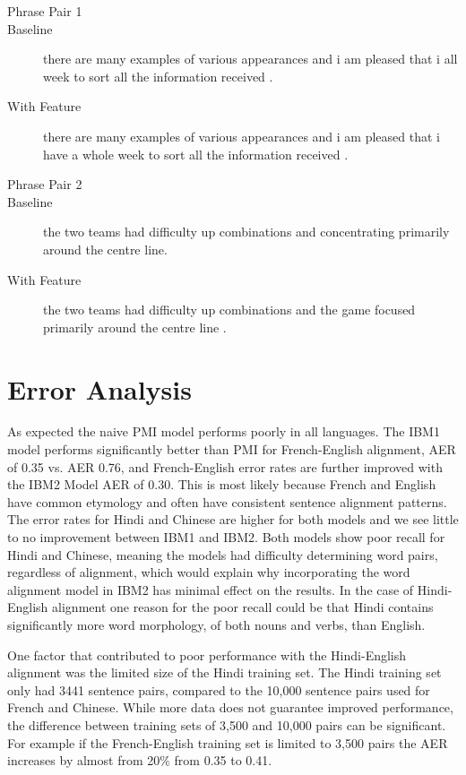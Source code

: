 \documentclass{article}
\begin{document}
\begin{description}

\item[Phrase Pair 1]
\item[Baseline] there are many examples of various appearances and i am pleased that i all week to sort all the information received .

\item[With Feature] there are many examples of various appearances and i am pleased that i have a whole week to sort all the information received .

\item[Phrase Pair 2]
\item[Baseline] the two teams had difficulty up combinations and concentrating primarily around the centre line.

\item[With Feature] the two teams had difficulty up combinations and the game focused primarily around the centre line .
\end{description}

\section*{Error Analysis}

As expected the naive PMI model performs poorly in all languages. The IBM1 model performs significantly better than PMI for French-English alignment, AER of 0.35 vs. AER 0.76, and French-English error rates are further improved with the IBM2 Model AER of 0.30. This is most likely because French and English have common etymology and often have consistent sentence alignment patterns. The error rates for Hindi and Chinese are higher for both models and we see little to no improvement between IBM1 and IBM2. Both models show poor recall for Hindi and Chinese, meaning the models had difficulty determining word pairs, regardless of alignment, which would explain why incorporating the word alignment model in IBM2 has minimal effect on the results. In the case of Hindi-English alignment one reason for the poor recall could be that Hindi contains significantly more word morphology, of both nouns and verbs, than English.

One factor that contributed to poor performance with the Hindi-English alignment was the limited size of the Hindi training set. The Hindi training set only had 3441 sentence pairs, compared to the 10,000 sentence pairs used for French and Chinese. While more data does not guarantee improved performance, the difference between training sets of 3,500 and 10,000 pairs can be significant. For example if the French-English training set is limited to 3,500 pairs the AER increases by almost from 20\% from 0.35 to 0.41.
\end{document}
